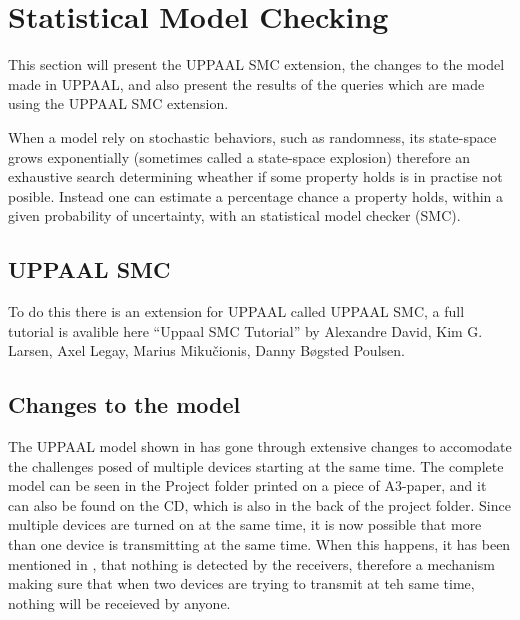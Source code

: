 \section{Statistical Model Checking}

This section will present the UPPAAL SMC extension, the changes to the model made in UPPAAL, and also present the results of the queries which are made using the UPPAAL SMC extension.

When a model rely on stochastic behaviors, such as randomness, its state-space grows exponentially (sometimes called a state-space explosion) therefore an exhaustive search determining wheather if some property holds is in practise not posible. 
Instead one can estimate a percentage chance a property holds, within a given probability of uncertainty, with an statistical model checker (SMC). 

\subsection{UPPAAL SMC}
To do this there is an extension for UPPAAL called UPPAAL SMC, a full tutorial is avalible here ``Uppaal SMC Tutorial''\cite{DBLP:journals/sttt/DavidLLMP15} by Alexandre David, Kim G. Larsen, Axel Legay, Marius Miku\v{c}ionis, Danny B\o gsted Poulsen.


\subsection*{Changes to the model}

The UPPAAL model shown in  has gone through extensive changes to accomodate the challenges posed of multiple devices starting at the same time.
The complete model can be seen in the Project folder printed on a piece of A3-paper, and it can also be found on the CD, which is also in the back of the project folder.
Since multiple devices are turned on at the same time, it is now possible that more than one device is transmitting at the same time. 
When this happens, it has been mentioned in , that nothing is detected by the receivers, therefore a mechanism making sure that when two devices are trying to transmit at teh same time, nothing will be receieved by anyone.

